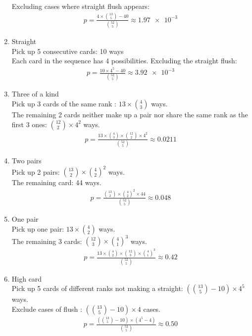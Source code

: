 \documentclass[a4paper]{article}
\begin{document}
\begin{enumerate}
		Excluding cases where straight flush appears: 
		\begin{align*}
		p = \frac{4 \times {13 \choose 5} - 40}{{52 \choose 5}} \approx \num{1.97e-3}
		\end{align*}
		\item Straight \\
		Pick up 5 consecutive cards: 10 ways\\
		Each card in the sequence has 4 possibilities. Excluding the straight flush:\\
		\begin{align*}
		p = \frac{10 \times 4^{5} - 40 }{{52 \choose 5}} \approx \num{3.92e-3}
		\end{align*}
		\item Three of a kind \\
		Pick up 3 cards of the same rank : $13\times {4 \choose 3}$ ways. \\
		The remaining 2 cards neither make up a pair nor share the same rank as the first 3 ones: ${12\choose 2} \times 4^{2}$ ways.
		\begin{align*}
		p = \frac{13\times {4 \choose 3}\times{12 \choose 2}\times 4^{2} }{{52\choose 5}} \approx 0.0211
		\end{align*}
		\item Two pairs\\
		Pick up 2 pairs: ${13 \choose 2}\times {4 \choose 2}^{2}$ ways. \\
		The remaining card: 44 ways. \\
		\begin{align*}
		p = \frac{{13 \choose 2}\times {4 \choose 2}^{2} \times 44}{{52 \choose 5}} \approx 0.048
		\end{align*}
		\item One pair\\
		Pick up one pair: $13 \times {4 \choose 2}$ ways. \\
		The remaining 3 cards: ${12 \choose 3} \times {4 \choose 1}^{3}$ ways. \\
		\begin{align*}
		p = \frac{13 \times {4 \choose 2} \times {12 \choose 3} \times {4 \choose 1}^{3}}{{52 \choose 5}} \approx 0.42
		\end{align*}
		\item High card \\
		Pick up 5 cards of different ranks not making a straight: $({13 \choose 5}-10)\times 4^{5}$ ways. \\
		Exclude cases of flush : $({13 \choose 5}-10)\times 4$ cases. \\
		\begin{align*}
		p = \frac{({13 \choose 5}-10)\times (4^{5}-4)}{{52 \choose 5}} \approx 0.50
		\end{align*}
	\end{enumerate}
\end{document}
